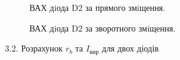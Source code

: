 \documentclass[a4paper,14pt]{extreport}
\begin{document}
\begin{figure}[h!]
\caption{ВАХ дiода D2 за прямого змiщення.}
\label{ris:image05}
\end{figure}


\begin{figure}[h]
\caption{ВАХ дiода D2 за зворотного змiщення.}
\label{ris:image4}
\end{figure}

\clearpage
\newpage
\begin{center}3.2. Розрахунок $r_b$ та $I_{\text{вир}}$ для двох діодів\\ \end{center}
\end{document}
